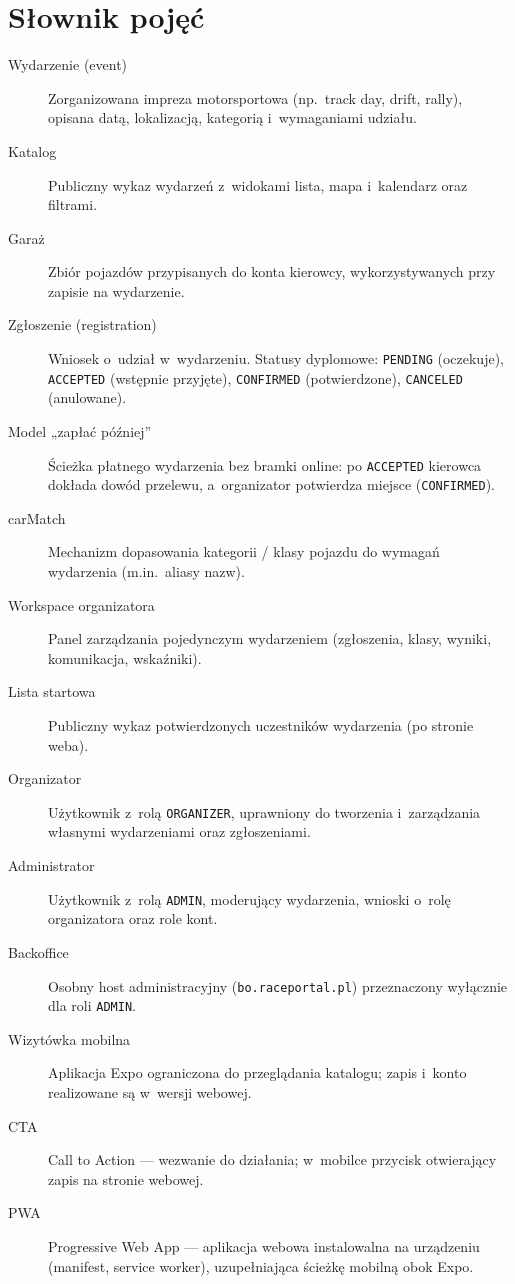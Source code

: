 \documentclass{sprz}
\begin{document}
\chapter{Słownik pojęć}
\begin{description}
  \item[Wydarzenie (event)] Zorganizowana impreza motorsportowa (np.\ track day, drift, rally), opisana datą, lokalizacją, kategorią i~wymaganiami udziału.
  \item[Katalog] Publiczny wykaz wydarzeń z~widokami lista, mapa i~kalendarz oraz filtrami.
  \item[Garaż] Zbiór pojazdów przypisanych do konta kierowcy, wykorzystywanych przy zapisie na wydarzenie.
  \item[Zgłoszenie (registration)] Wniosek o~udział w~wydarzeniu. Statusy dyplomowe: \texttt{PENDING} (oczekuje), \texttt{ACCEPTED} (wstępnie przyjęte), \texttt{CONFIRMED} (potwierdzone), \texttt{CANCELED} (anulowane).
  \item[Model „zapłać później”] Ścieżka płatnego wydarzenia bez bramki online: po \texttt{ACCEPTED} kierowca dokłada dowód przelewu, a~organizator potwierdza miejsce (\texttt{CONFIRMED}).
  \item[carMatch] Mechanizm dopasowania kategorii / klasy pojazdu do wymagań wydarzenia (m.in.\ aliasy nazw).
  \item[Workspace organizatora] Panel zarządzania pojedynczym wydarzeniem (zgłoszenia, klasy, wyniki, komunikacja, wskaźniki).
  \item[Lista startowa] Publiczny wykaz potwierdzonych uczestników wydarzenia (po stronie weba).
  \item[Organizator] Użytkownik z~rolą \texttt{ORGANIZER}, uprawniony do tworzenia i~zarządzania własnymi wydarzeniami oraz zgłoszeniami.
  \item[Administrator] Użytkownik z~rolą \texttt{ADMIN}, moderujący wydarzenia, wnioski o~rolę organizatora oraz role kont.
  \item[Backoffice] Osobny host administracyjny (\texttt{bo.raceportal.pl}) przeznaczony wyłącznie dla roli \texttt{ADMIN}.
  \item[Wizytówka mobilna] Aplikacja Expo ograniczona do przeglądania katalogu; zapis i~konto realizowane są w~wersji webowej.
  \item[CTA] Call to Action --- wezwanie do działania; w~mobilce przycisk otwierający zapis na stronie webowej.
  \item[PWA] Progressive Web App --- aplikacja webowa instalowalna na urządzeniu (manifest, service worker), uzupełniająca ścieżkę mobilną obok Expo.

\end{description}
\end{document}

